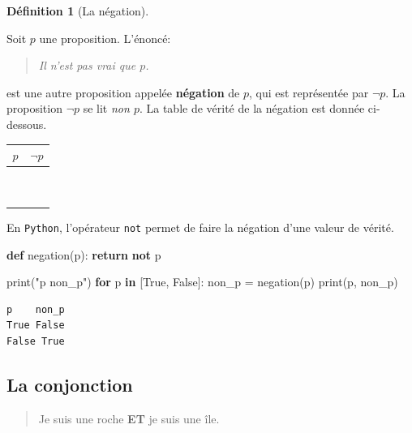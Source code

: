 \documentclass[
  letterpaper,
]{scrbook}
\newenvironment{Shaded}{}{}
\newcommand{\BuiltInTok}[1]{#1}
\newcommand{\ControlFlowTok}[1]{\textcolor[rgb]{0.00,0.44,0.13}{\textbf{#1}}}
\newcommand{\KeywordTok}[1]{\textcolor[rgb]{0.00,0.44,0.13}{\textbf{#1}}}
\newcommand{\NormalTok}[1]{#1}
\newcommand{\OperatorTok}[1]{\textcolor[rgb]{0.40,0.40,0.40}{#1}}
\newcommand{\StringTok}[1]{\textcolor[rgb]{0.25,0.44,0.63}{#1}}
\newcommand{\VariableTok}[1]{\textcolor[rgb]{0.10,0.09,0.49}{#1}}
\theoremstyle{definition}
\theoremstyle{definition}
\newtheorem{definition}{Définition}[chapter]
\theoremstyle{plain}
\theoremstyle{remark}
\begin{document}
\leavevmode{}%
\begin{definition}[La négation]\label{def-negation}

Soit \(p\) une proposition. L'énoncé:

\begin{quote}
\emph{Il n'est pas vrai que \(p\).}
\end{quote}

est une autre proposition appelée \textbf{négation} de \(p\), qui est
représentée par \(\lnot p\). La proposition \(\lnot p\) se lit \emph{non
\(p\)}. La table de vérité de la négation est donnée ci-dessous.

\begin{longtable}[]{@{}cc@{}}
\toprule()
\(p\) & \(\lnot p\) \\
\midrule()
\endhead
\(\phantom{V}\) & \(\phantom{V}\) \\
\(\phantom{V}\) & \(\phantom{V}\) \\
\bottomrule()
\end{longtable}

En \texttt{Python}, l'opérateur \texttt{not} permet de faire la négation
d'une valeur de vérité.

\hypertarget{negation-python}{}
\begin{Shaded}
\begin{Highlighting}[]
\KeywordTok{def}\NormalTok{ negation(p):}
    \ControlFlowTok{return} \KeywordTok{not}\NormalTok{ p}

\BuiltInTok{print}\NormalTok{(}\StringTok{"p    non\_p"}\NormalTok{)}
\ControlFlowTok{for}\NormalTok{ p }\KeywordTok{in}\NormalTok{ [}\VariableTok{True}\NormalTok{, }\VariableTok{False}\NormalTok{]:}
\NormalTok{    non\_p }\OperatorTok{=}\NormalTok{ negation(p)}
    \BuiltInTok{print}\NormalTok{(p, non\_p)}
\end{Highlighting}
\end{Shaded}

\begin{verbatim}
p    non_p
True False
False True
\end{verbatim}

\end{definition}

\hypertarget{la-conjonction}{%
\subsection{La conjonction}\label{la-conjonction}}

\begin{quote}
Je suis une roche \textbf{ET} je suis une île.
\end{quote}
\end{document}
